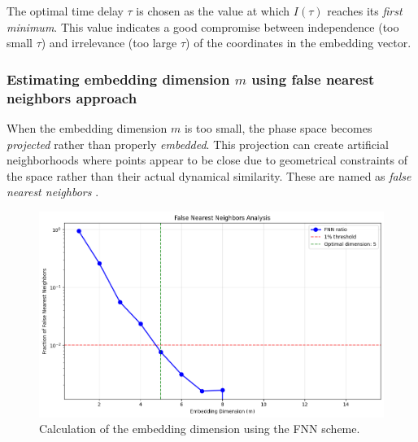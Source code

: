 \documentclass{article}
\begin{document}
			The optimal time delay \( \tau \) is chosen as the value at which 
			\( I(\tau) \) reaches its \textit{first minimum}. 
			This value indicates a good compromise 
			between independence (too small \( \tau \)) and irrelevance (too large \( \tau \)) 
			of the coordinates in the embedding vector.
				

		


			\subsubsection{Estimating embedding dimension \( m \) using false nearest neighbors approach}

			When the embedding dimension $m$ is too small, 
			the phase space becomes \emph{projected} rather than 
			properly \emph{embedded}. 
			This projection can create artificial neighborhoods where points appear to be close due to 
			geometrical constraints of the space rather than their actual dynamical similarity. 
			These are named as \emph{false nearest neighbors} \cite{kennel1992}.


				\begin{figure}[h!]
				    \centering
				    \includegraphics[width=0.8\linewidth]{fnn_estim.png}
				    \caption{Calculation of the embedding dimension using the FNN scheme.}
				    \label{fig:fnn_plot}
				\end{figure}
\end{document}
